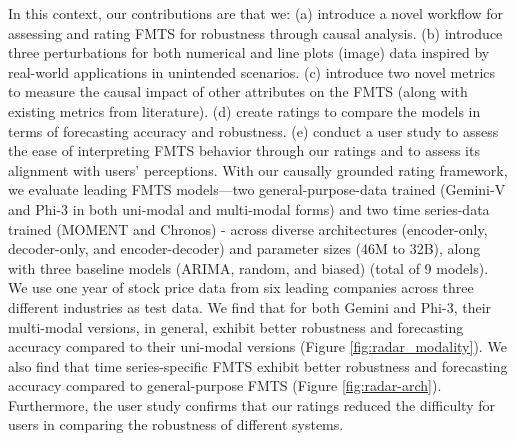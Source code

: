 In this context, our contributions are that we: (a) introduce a novel workflow for assessing and rating FMTS for robustness through causal analysis. 
(b) introduce three perturbations for both numerical and line plots (image) data inspired by real-world applications in unintended scenarios.
(c) introduce two novel metrics to measure the causal impact of other attributes on the FMTS (along with existing metrics from literature).
(d) create ratings to compare the models in terms of forecasting accuracy and robustness.
(e) conduct a user study to assess the ease of interpreting FMTS behavior through our ratings and to assess its alignment with users' perceptions.
With our causally grounded rating framework, we evaluate leading FMTS models—two general-purpose-data trained (Gemini-V and Phi-3 in both uni-modal and multi-modal forms) and two time series-data trained (MOMENT and Chronos) - across diverse architectures (encoder-only, decoder-only, and encoder-decoder) and parameter sizes (46M to 32B), along with three baseline models (ARIMA, random, and biased) (total of 9 models). We use one year of stock price data from six leading companies across three different industries as test data. We find that for both Gemini and Phi-3, their multi-modal versions, in general, exhibit better robustness and forecasting accuracy compared to their uni-modal versions (Figure \ref{fig:radar_modality}). We also find that time series-specific FMTS exhibit better robustness and forecasting accuracy compared to general-purpose FMTS (Figure \ref{fig:radar-arch}). Furthermore, the user study confirms that our ratings reduced the difficulty for users in comparing the robustness of different systems.
